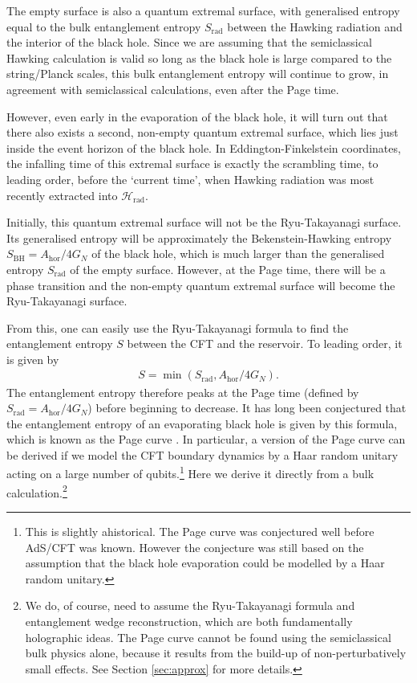 \documentclass[12pt]{article}
\newcommand{\Srad}{S_\text{rad} }
\begin{document}
The empty surface is also a quantum extremal surface, with generalised entropy equal to the bulk entanglement entropy $\Srad$ between the Hawking radiation and the interior of the black hole. Since we are assuming that the semiclassical Hawking calculation is valid so long as the black hole is large compared to the string/Planck scales, this bulk entanglement entropy will continue to grow, in agreement with semiclassical calculations, even after the Page time.

However, even early in the evaporation of the black hole, it will turn out that there also exists a second, non-empty quantum extremal surface, which lies just inside the event horizon of the black hole. In Eddington-Finkelstein coordinates, the infalling time of this extremal surface is exactly the scrambling time, to leading order, before the `current time', when Hawking radiation was most recently extracted into $\mathcal{H}_\text{rad}$.

Initially, this quantum extremal surface will not be the Ryu-Takayanagi surface. Its generalised entropy will be approximately the Bekenstein-Hawking entropy $S_\text{BH} = A_\text{hor} / 4G_N$ of the black hole, which is much larger than the generalised entropy $\Srad$ of the empty surface. However, at the Page time, there will be a phase transition and the non-empty quantum extremal surface will become the Ryu-Takayanagi surface. 

From this, one can easily use the Ryu-Takayanagi formula to find the entanglement entropy $S$ between the CFT and the reservoir. To leading order, it is given by
\begin{align}
S = \min(\Srad, A_\text{hor}/4G_N).
\end{align}
The entanglement entropy therefore peaks at the Page time (defined by $\Srad = A_\text{hor}/4G_N$) before beginning to decrease. It has long been conjectured that the entanglement entropy of an evaporating black hole is given by this formula, which is known as the Page curve \cite{page1993information}. In particular, a version of the Page curve can be derived if we model the CFT boundary dynamics by a Haar random unitary acting on a large number of qubits.\footnote{This is slightly ahistorical. The Page curve was conjectured well before AdS/CFT was known. However the conjecture was still based on the assumption that the black hole evaporation could be modelled by a Haar random unitary.}
Here we derive it directly from a bulk calculation.\footnote{We do, of course, need to assume the Ryu-Takayanagi formula and entanglement wedge reconstruction, which are both fundamentally holographic ideas. The Page curve cannot be found using the semiclassical bulk physics alone, because it results from the build-up of non-perturbatively small effects. See Section \ref{sec:approx} for more details.}
\end{document}
